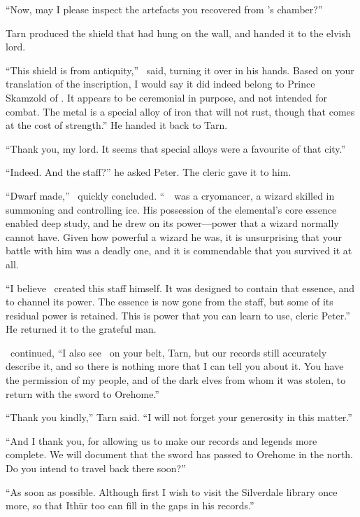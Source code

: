 ``Now, may I please inspect the artefacts you recovered from \mothzam's chamber?''

Tarn produced the shield that had hung on the wall, and handed it to the elvish lord.

``This shield is from antiquity,'' \arilor\ said, turning it over in his hands.  Based on your translation of the inscription, I would say it did indeed belong to Prince Skamzold of \atmudarant.  It appears to be ceremonial in purpose, and not intended for combat.  The metal is a special alloy of iron that will not rust, though that comes at the cost of strength.''  He handed it back to Tarn.

``Thank you, my lord.  It seems that special alloys were a favourite of that city.''

``Indeed.  And the staff?''  he asked Peter.  The cleric gave it to him.

``Dwarf made,'' \arilor\ quickly concluded.  ``\mothzam\ \driktur\ was a cryomancer, a wizard skilled in summoning and controlling ice.  His possession of the elemental's core essence enabled deep study, and he drew on its power---power that a wizard normally cannot have.  Given how powerful a wizard he was, it is unsurprising that your battle with him was a deadly one, and it is commendable that you survived it at all.

``I believe \mothzam\ created this staff himself.  It was designed to contain that essence, and to channel its power.  The essence is now gone from the staff, but some of its residual power is retained.  This is power that you can learn to use, cleric Peter.''  He returned it to the grateful man.

\arilor\ continued, ``I also see \kildir\ on your belt, Tarn, but our records still accurately describe it, and so there is nothing more that I can tell you about it.  You have the permission of my people, and of the dark elves from whom it was stolen, to return with the sword to Orehome.''

``Thank you kindly,'' Tarn said.  ``I will not forget your generosity in this matter.''

``And I thank you, for allowing us to make our records and legends more complete.  We will document that the sword has passed to Orehome in the north.  Do you intend to travel back there soon?''

``As soon as possible.  Although first I wish to visit the Silverdale library once more, so that Ith\=ur too can fill in the gaps in his records.''

